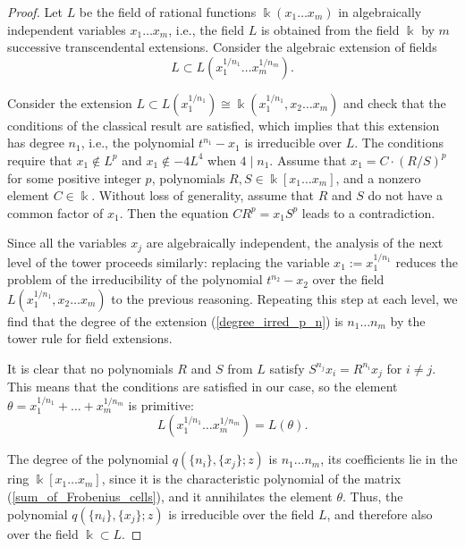 \documentclass[14pt, dvipsnames]{extarticle}
\theoremstyle{definition}
\theoremstyle{definition}
\theoremstyle{remark}
\DeclareMathOperator{\kk}{\Bbbk}
\begin{document}
\begin{proof}
Let $L$ be the field of rational functions $\kk(x_1\dots x_m)$ in algebraically independent variables $x_1\dots x_m$, i.e., the field $L$ is obtained from the field $\kk$ by $m$ successive transcendental extensions. Consider the algebraic extension of fields
\begin{equation}\label{degree_irred_p_n}L\subset L(x_1^{1/n_1}\dots x_m^{1/n_m}).\end{equation}

Consider the extension $L\subset L(x_1^{1/n_1})\cong \kk(x_1^{1/n_1}, x_2\dots x_m)$ and check that the conditions of the classical result \cite[Chapter VI, Theorem 9.1]{Lang} are satisfied, which implies that this extension has degree $n_1$, i.e., the polynomial $t^{n_1} - x_1$ is irreducible over $L$. The conditions \cite[Chapter VI, Theorem 9.1]{Lang} require that $x_1 \notin L^p$ and $x_1 \notin -4L^4$ when $4 \mid n_1$. Assume that $x_1 = C\cdot (R/S)^p$ for some positive integer $p$, polynomials $R, S \in \kk[x_1\dots x_m]$, and a nonzero element $C \in \kk$. Without loss of generality, assume that $R$ and $S$ do not have a common factor of $x_1$. Then the equation $CR^p = x_1S^p$ leads to a contradiction.

Since all the variables $x_j$ are algebraically independent, the analysis of the next level of the tower proceeds similarly: replacing the variable $x_1 := x_1^{1/n_1}$ reduces the problem of the irreducibility of the polynomial $t^{n_2} - x_2$ over the field $L(x_1^{1/n_1}, x_2\dots x_m)$ to the previous reasoning. Repeating this step at each level, we find that the degree of the extension (\ref{degree_irred_p_n}) is $n_1 \dots n_m$ by the tower rule for field extensions.

It is clear that no polynomials $R$ and $S$ from $L$ satisfy $S^{n_j}x_i = R^{n_i}x_j$ for $i \neq j$. This means that the conditions \cite[Corollary 4.7]{Albu} are satisfied in our case, so the element $\theta = x_1^{1/n_1} + … + x_m^{1/n_m}$ is primitive: $$L(x_1^{1/n_1}\dots x_m^{1/n_m}) = L(\theta).$$

The degree of the polynomial $q(\{n_i\}, \{x_j\}; z)$ is $n_1 \dots n_m$, its coefficients lie in the ring $\kk[x_1\dots x_m]$, since it is the characteristic polynomial of the matrix (\ref{sum_of_Frobenius_cells}), and it annihilates the element $\theta$. Thus, the polynomial $q(\{n_i\}, \{x_j\}; z)$ is irreducible over the field $L$, and therefore also over the field $\kk \subset L$.
\end{proof}
\end{document}
